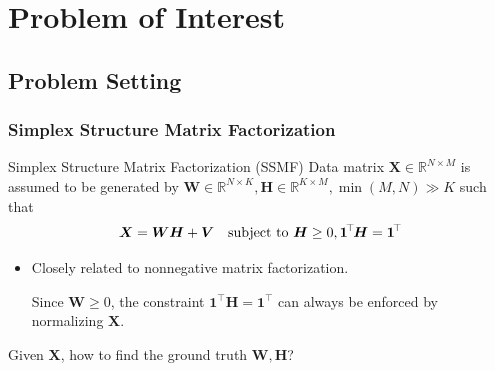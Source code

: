 \documentclass[10pt,xcolor={usenames,dvipsnames,table}]{beamer}
\def\blue{\color{blue}}
\newcommand{\T}{\!\top\!}
\newcommand{\citep}[1]{{\blue \scriptsize \parencite{#1}}}
\begin{document}
\section{Problem of Interest}%

\subsection{Problem Setting}%
\label{sub:separable_nmf}


\begin{frame}
    \frametitle{Simplex Structure Matrix Factorization}

    {
    \begin{block}{Simplex Structure Matrix Factorization (SSMF)}
    Data matrix $\bm{X} \in \mathbb{R}^{N \times M}$ is assumed to be generated by $\bm{W} \in \mathbb{R}^{N \times K}, \bm{H} \in \mathbb{R}^{K \times M}, \min(M, N) \gg K$  such that
    \[
    \bm{X} = \bm{W} \bm{H} + \bm{V} \quad \text{\rm subject to } \bm{H} \geq 0 , \bm{1}^{\T}\bm{H} = \bm{1}^{\T}
    \] 
    \end{block}}
    \begin{itemize}
        \item Closely related to nonnegative matrix factorization.
            
Since $\bm{W} \geq 0$, the constraint $ \bm{1}^{\T}\bm{H}= \bm{1}^{\T}$ can always be enforced by normalizing $\bm{X}$.
    \end{itemize}

    \begin{block}
        
    Given $\bm{X}$, how to find the ground truth $\bm{W}, \bm{H}$?
    \end{block}


\end{frame}
\end{document}

